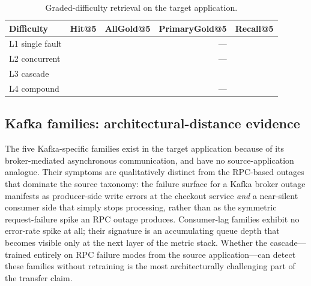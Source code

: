 
\begin{table}[ht]
  \centering
  \caption{Graded-difficulty retrieval on the target application.}
  \label{tab:cross-app-graded}
  \small
  \begin{tabular}{lrrrr}
    \toprule
    Difficulty & Hit@5 & AllGold@5 & PrimaryGold@5 & Recall@5 \\
    \midrule
    L1 single fault & \todo{} & \todo{} & --- & \todo{} \\
    L2 concurrent   & \todo{} & \todo{} & --- & \todo{} \\
    L3 cascade      & \todo{} & \todo{} & \todo{} & \todo{} \\
    L4 compound     & \todo{} & \todo{} & --- & \todo{} \\
    \bottomrule
  \end{tabular}
\end{table}

\subsection{Kafka families: architectural-distance evidence}
\label{sec:cross-app:kafka}

The five Kafka-specific families exist in the target application because of its broker-mediated asynchronous communication, and have no source-application analogue. Their symptoms are qualitatively distinct from the RPC-based outages that dominate the source taxonomy: the failure surface for a Kafka broker outage manifests as producer-side write errors at the checkout service \emph{and} a near-silent consumer side that simply stops processing, rather than as the symmetric request-failure spike an RPC outage produces. Consumer-lag families exhibit no error-rate spike at all; their signature is an accumulating queue depth that becomes visible only at the next layer of the metric stack. Whether the cascade---trained entirely on RPC failure modes from the source application---can detect these families without retraining is the most architecturally challenging part of the transfer claim. 

